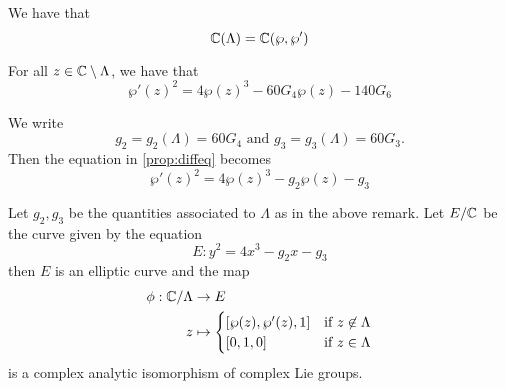 \begin{theorem}
	\label{thm:wp-generates}
	We have that
	\begin{equation*}
		\mathbb{C}(\Lambda) = \mathbb{C}(\wp, \wp')
	\end{equation*}
\end{theorem}



\begin{proposition}
	\label{prop:diffeq}
	For all $z \in \mathbb{C} \setminus \Lambda$, we have that
	\begin{equation*}
		\wp'(z)^2 = 4\wp(z)^3 - 60G_4\wp(z) - 140G_6
	\end{equation*}
\end{proposition}

\begin{remark}
	We write
	\begin{equation*}
		g_2 = g_2(\Lambda) = 60G_4
		\textrm{ and }
		g_3 = g_3(\Lambda) = 60G_3.
	\end{equation*}
	Then the equation in \ref{prop:diffeq} becomes
	\begin{equation*}
		\wp'(z)^2 = 4\wp(z)^3 - g_2\wp(z) - g_3
	\end{equation*}
\end{remark}

\begin{theorem}
	\label{thm:lattice-curve}
	Let $g_2, g_3$ be the quantities associated to $\Lambda$ as in the above
	remark.
	Let $E/\mathbb{C}$ be the curve given by the equation
	\begin{equation*}
		E: y^2 = 4x^3 - g_2 x - g_3
	\end{equation*}
	then $E$ is an elliptic curve and the map
	\begin{align*}
		\phi: \mathbb{C}/\Lambda &\to E\\
		z &\mapsto 
		\begin{cases}
			[\wp(z), \wp'(z), 1] &\textrm{if } z \not\in \Lambda\\
			[0, 1, 0] &\textrm{if } z \in \Lambda
		\end{cases}
	\end{align*}
	is a complex analytic isomorphism of complex Lie groups.
\end{theorem}

